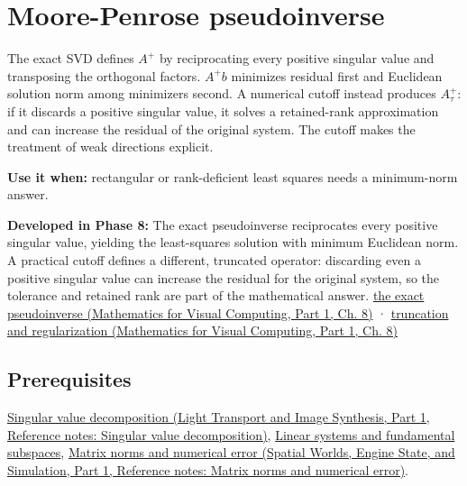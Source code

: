 \hypertarget{appendix-541306fdbc1b}{}\label{referencestart:appendix-541306fdbc1b}
\section{Moore-Penrose pseudoinverse}\label{appendix-541306fdbc1b-moore-penrose-pseudoinverse}

\hypertarget{appendix-541306fdbc1b-moore-penrose-pseudoinverse}{}

The exact SVD defines \(A^+\) by reciprocating every positive singular value and transposing the orthogonal factors. \(A^+b\) minimizes residual first and Euclidean solution norm among minimizers second. A numerical cutoff instead produces \(A_\tau^+\): if it discards a positive singular value, it solves a retained-rank approximation and can increase the residual of the original system. The cutoff makes the treatment of weak directions explicit.

\textbf{Use it when:} rectangular or rank-deficient least squares needs a minimum-norm answer.

\textbf{Developed in Phase 8:} The exact pseudoinverse reciprocates every positive singular value, yielding the least-squares solution with minimum Euclidean norm. A practical cutoff defines a different, truncated operator: discarding even a positive singular value can increase the residual for the original system, so the tolerance and retained rank are part of the mathematical answer. \href{../02-Mathematics-for-Visual-Computing-P01/main.pdf\#02-foundations-ii-ch024-the-moorepenrose-inverse-and-its-four-identities}{the exact pseudoinverse (Mathematics for Visual Computing, Part 1, Ch. 8)} · \href{../02-Mathematics-for-Visual-Computing-P01/main.pdf\#02-foundations-ii-ch024-thresholding-and-regularization-are-different-choices}{truncation and regularization (Mathematics for Visual Computing, Part 1, Ch. 8)}

\subsection{Prerequisites}\label{appendix-541306fdbc1b-prerequisites}

\hypertarget{appendix-541306fdbc1b-prerequisites}{}

\href{../04-Light-Transport-and-Image-Synthesis-P01/main.pdf\#appendix-1fad5e7f36fa}{Singular value decomposition (Light Transport and Image Synthesis, Part 1, Reference notes: Singular value decomposition)}, \hyperref[appendix-8572a4a060c1]{Linear systems and fundamental subspaces}, \href{../05-Spatial-Worlds-Engine-State-and-Simulation-P01/main.pdf\#appendix-f8657bac66e5}{Matrix norms and numerical error (Spatial Worlds, Engine State, and Simulation, Part 1, Reference notes: Matrix norms and numerical error)}.

